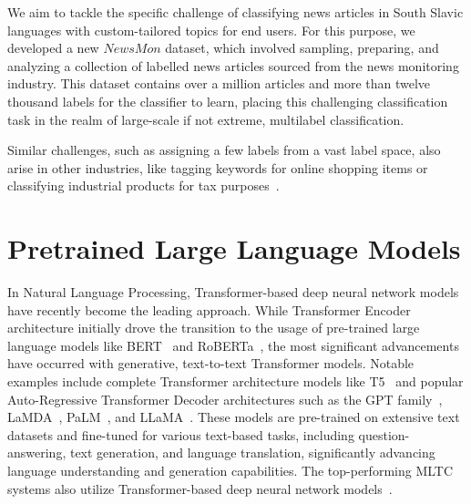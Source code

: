 We aim to tackle the specific challenge of classifying news articles in South Slavic languages with custom-tailored topics for end users. 
For this purpose, we developed a new $NewsMon$ dataset, which involved sampling, preparing, and analyzing a collection of labelled news articles sourced from the news monitoring industry. 
This dataset contains over a million articles and more than twelve thousand labels for the classifier to learn, placing this challenging classification task in the realm of large-scale if not extreme, multilabel classification.

Similar challenges, such as assigning a few labels from a vast label space, also arise in other industries, like tagging keywords for online shopping items or classifying industrial products for tax purposes~\parencite{zhang2023longtailed}.

\section{Pretrained Large Language Models}
\label{sec:llm}
In Natural Language Processing, Transformer-based deep neural network models~\parencite{vaswani2017attention} have recently become the leading approach. 
While Transformer Encoder architecture initially drove the transition to the usage of pre-trained large language models like BERT~\parencite{devlin2018bert} and RoBERTa~\parencite{liu2019roberta}, the most significant advancements have occurred with generative, text-to-text Transformer models. 
Notable examples include complete Transformer architecture models like T5~\parencite{raffel2020exploring} and popular Auto-Regressive Transformer Decoder architectures such as the GPT family~\parencite{radford2018improving, radford2019language, brown2020language}, LaMDA~\parencite{thoppilan2022lamda}, PaLM~\parencite{chowdhery2022palm}, and LLaMA~\parencite{touvron2023llama, touvron2023llama2openfoundation}. 
These models are pre-trained on extensive text datasets and fine-tuned for various text-based tasks, including question-answering, text generation, and language translation, significantly advancing language understanding and generation capabilities. 
The top-performing MLTC systems also utilize Transformer-based deep neural network models~\parencite{tarekegn2024deeplearningmultilabellearning}.

